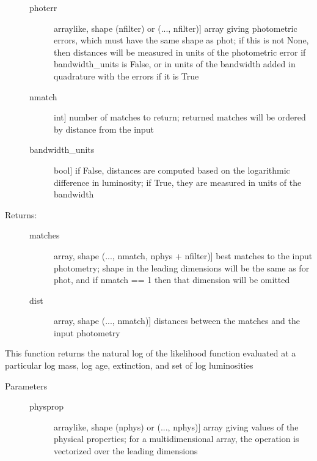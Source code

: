 \documentclass[letterpaper,10pt,english]{sphinxmanual}
\begin{document}
\begin{fulllineitems}
\begin{fulllineitems}
\begin{description}
\begin{description}
\item[{photerr}] \leavevmode{[}arraylike, shape (nfilter) or (..., nfilter){]}
array giving photometric errors, which must have the
same shape as phot; if this is not None,
then distances will be measured in units of the
photometric error if bandwidth\_units is False, or in
units of the bandwidth added in quadrature with the
errors if it is True

\item[{nmatch}] \leavevmode{[}int{]}
number of matches to return; returned matches will be
ordered by distance from the input

\item[{bandwidth\_units}] \leavevmode{[}bool{]}
if False, distances are computed based on the
logarithmic difference in luminosity; if True, they are
measured in units of the bandwidth

\end{description}

\item[{Returns:}] \leavevmode\begin{description}
\item[{matches}] \leavevmode{[}array, shape (..., nmatch, nphys + nfilter){]}
best matches to the input photometry; shape in the
leading dimensions will be the same as for phot, and if
nmatch == 1 then that dimension will be omitted

\item[{dist}] \leavevmode{[}array, shape (..., nmatch){]}
distances between the matches and the input photometry

\end{description}

\end{description}

\end{fulllineitems}


\begin{fulllineitems}
\label{bayesphot:slugpy.bayesphot.bp.bp.logL}
This function returns the natural log of the likelihood
function evaluated at a particular log mass, log age,
extinction, and set of log luminosities
\begin{description}
\item[{Parameters}] \leavevmode\begin{description}
\item[{physprop}] \leavevmode{[}arraylike, shape (nphys) or (..., nphys){]}
array giving values of the physical properties; for a
multidimensional array, the operation is vectorized over
the leading dimensions


\end{description}
\end{description}
\end{fulllineitems}
\end{fulllineitems}
\end{document}
